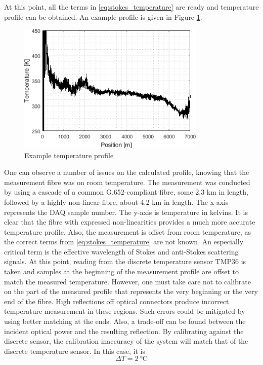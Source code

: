 \documentclass{standalone}
\begin{document}
At this point, all the terms in \ref{eq:stokes_temperature} are ready and temperature profile can be obtained. An example profile is given in Figure \ref{fig:temperature_example}.
\begin{figure}[h]
	\centering
	\includegraphics[width=0.8\textwidth]{temperature_example.png}
	\caption{Example temperature profile}
	\label{fig:temperature_example}
\end{figure}
One can observe a number of issues on the calculated profile, knowing that the measurement fibre was on room temperature. The measurement was conducted by using a cascade of a common G.652-compliant fibre, some 2.3 km in length, followed by a highly non-linear fibre, about 4.2 km in length. The x-axis represents the DAQ sample number. The y-axis is temperature in kelvins. It is clear that the fibre with expressed non-linearities provides a much more accurate temperature profile. Also, the measurement is offset from room temperature, as the correct terms from \ref{eq:stokes_temperature} are not known. An especially critical term is the effective wavelength of Stokes and anti-Stokes scattering signals. At this point, reading from the discrete temperature sensor TMP36 is taken and samples at the beginning of the measurement profile are offset to match the measured temperature. However, one must take care not to calibrate on the part of the measured profile that represents the very beginning or the very end of the fibre. High reflections off optical connectors produce incorrect temperature measurement in these regions. Such errors could be mitigated by using better matching at the ends. Also, a trade-off can be found between the incident optical power and the resulting reflection. By calibrating against the discrete sensor, the calibration inaccuracy of the system will match that of the discrete temperature sensor. In this case, it is \cite{datasheet:tmp36}
\begin{equation}
\varDelta T = \SI{2}{\celsius}
\end{equation} \\
\end{document}
